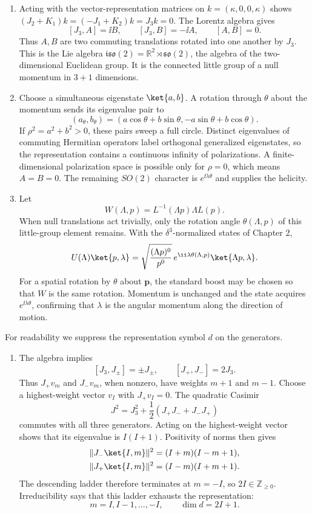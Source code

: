 \begin{enumerate}
\begin{enumerate}
\item
Acting with the vector-representation matrices on
\(k=(\kappa,0,0,\kappa)\) shows
\((J_2+K_1)k=(-J_1+K_2)k=J_3k=0\).  The Lorentz algebra gives
\[
 [J_3,A]=\ii B,\qquad
 [J_3,B]=-\ii A,\qquad
 [A,B]=0.
\]
Thus \(A,B\) are two commuting translations rotated into one another by
\(J_3\).  This is the Lie algebra
\(\mathfrak{iso}(2)=\mathbb R^2\rtimes\mathfrak{so}(2)\), the algebra of
the two-dimensional Euclidean group.  It is the connected little group of
a null momentum in \(3+1\) dimensions.
\item
Choose a simultaneous eigenstate
\(\ket{a,b}\).  A rotation through \(\theta\) about the momentum sends its
eigenvalue pair to
\[
 (a_\theta,b_\theta)
 =(a\cos\theta+b\sin\theta,-a\sin\theta+b\cos\theta).
\]
If \(\rho^2=a^2+b^2>0\), these pairs sweep a full circle.  Distinct
eigenvalues of commuting Hermitian operators label orthogonal generalized
eigenstates, so the representation contains a continuous infinity of
polarizations.  A finite-dimensional polarization space is possible only
for \(\rho=0\), which means \(A=B=0\).  The remaining \(SO(2)\) character
is \(e^{\ii\lambda\theta}\) and supplies the helicity.
\item
Let
\[
 W(\Lambda,p)=L^{-1}(\Lambda p)\Lambda L(p).
\]
When null translations act trivially, only the rotation angle
\(\theta(\Lambda,p)\) of this little-group element remains.  With the
\(\delta^3\)-normalized states of Chapter 2,
\[
 U(\Lambda)\ket{p,\lambda}
 =\sqrt{\frac{(\Lambda p)^0}{p^0}}\,
 e^{\ii\lambda\theta(\Lambda,p)}
 \ket{\Lambda p,\lambda}.
\]
For a spatial rotation by \(\theta\) about \(\mathbf p\), the standard
boost may be chosen so that \(W\) is the same rotation.  Momentum is
unchanged and the state acquires \(e^{\ii\lambda\theta}\), confirming that
\(\lambda\) is the angular momentum along the direction of motion.
\end{enumerate}

For readability we suppress the representation symbol \(d\) on the
generators.
\begin{enumerate}
\item[(a)] The algebra implies
\[
 [J_3,J_\pm]=\pm J_\pm,
 \qquad [J_+,J_-]=2J_3.
\]
Thus \(J_+v_m\) and \(J_-v_m\), when nonzero, have weights \(m+1\) and
\(m-1\).  Choose a highest-weight vector \(v_I\) with
\(J_+v_I=0\).  The quadratic Casimir
\[
 J^2=J_3^2+\frac12(J_+J_-+J_-J_+)
\]
commutes with all three generators.  Acting on the highest-weight vector
shows that its eigenvalue is \(I(I+1)\).  Positivity of norms then gives
\[
\begin{aligned}
 \lVert J_-\ket{I,m}\rVert^2&=(I+m)(I-m+1),\\
 \lVert J_+\ket{I,m}\rVert^2&=(I-m)(I+m+1).
\end{aligned}
\]
The descending ladder therefore terminates at \(m=-I\), so
\(2I\in\mathbb Z_{\ge0}\).  Irreducibility says that this ladder exhausts
the representation:
\[
 m=I,I-1,\ldots,-I,
 \qquad \dim d=2I+1.
\]


\end{enumerate}
\end{enumerate}
